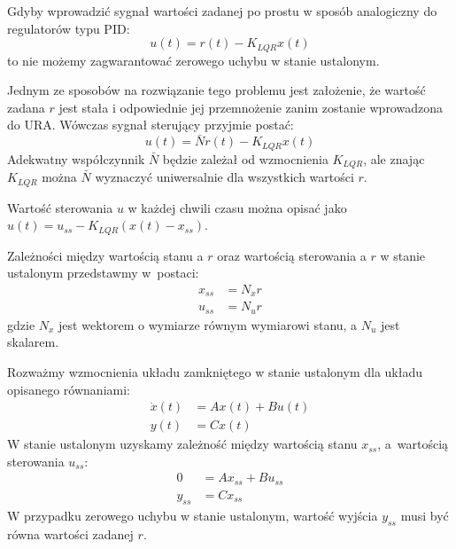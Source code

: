 \documentclass{article}
\begin{document}
    Gdyby wprowadzić sygnał wartości zadanej po prostu w sposób analogiczny do regulatorów typu PID:
    \begin{equation}
        u(t) = r(t)-K_{LQR}x(t)
    \end{equation}
    to nie możemy zagwarantować zerowego uchybu w stanie ustalonym. 
    
    Jednym ze sposobów na rozwiązanie tego problemu jest założenie, że wartość zadana $r$ jest stała i odpowiednie jej przemnożenie zanim zostanie wprowadzona do URA.
    Wówczas sygnał sterujący przyjmie postać:
    \begin{equation}        u(t) = \bar{N}r(t) - K_{LQR}x(t)   \end{equation}
    Adekwatny współczynnik $\bar{N}$ będzie zależał od wzmocnienia $K_{LQR}$, ale znając $K_{LQR}$ można $\bar{N}$ wyznaczyć uniwersalnie dla wszystkich wartości $r$.
        
    Wartość sterowania $u$ w każdej chwili czasu można opisać jako $u(t) = u_{ss} - K_{LQR}(x(t) - x_{ss})$.

    Zależności między wartością stanu a $r$ oraz wartością sterowania a $r$ w stanie ustalonym przedstawmy w~postaci:  
    \begin{align*}
        x_{ss} &= N_x r \\
        u_{ss} &= N_u r
    \end{align*}
    gdzie $N_x$ jest wektorem o wymiarze równym wymiarowi stanu, a $N_u$ jest skalarem. 

    Rozważmy wzmocnienia układu zamkniętego w stanie ustalonym dla układu opisanego równaniami:
    \begin{align*}
        \dot{x}(t) &= Ax(t)+Bu(t) \\
        y(t) &= Cx(t)    
    \end{align*}
    W stanie ustalonym uzyskamy zależność między wartością stanu $x_{ss}$, a~wartością sterowania $u_{ss}$:
    \begin{align*}
        0 &= Ax_{ss}+Bu_{ss} \\
        y_{ss} &= Cx_{ss}    
    \end{align*}
    W przypadku zerowego uchybu w stanie ustalonym, wartość wyjścia $y_{ss}$ musi być równa wartości zadanej $r$.
\end{document}
